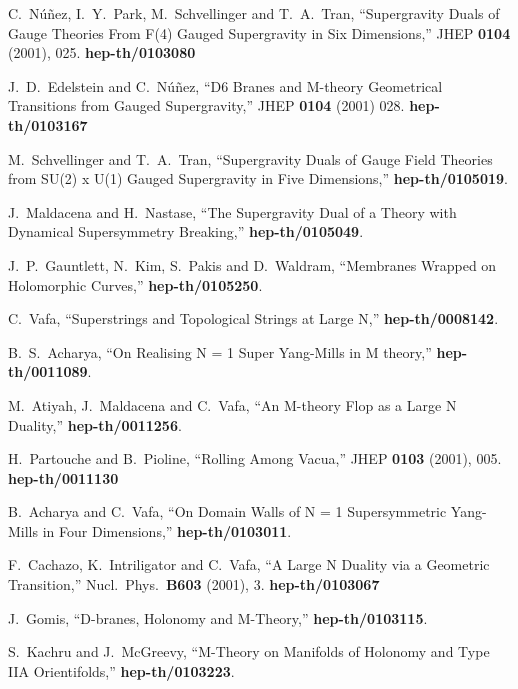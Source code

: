 \documentclass[12pt,a4paper]{article}
\begin{document}
\begin{thebibliography}{99}
 C.~N\'u\~nez, I.~Y.~Park, M.~Schvellinger and T.~A.~Tran,
``Supergravity Duals of Gauge Theories From F(4) Gauged Supergravity in Six Dimensions,''
JHEP {\bf 0104} (2001), 025. {\bf hep-th/0103080}

 J.~D.~Edelstein and C.~N\'u\~nez,
``D6 Branes and M-theory Geometrical Transitions from Gauged Supergravity,''
JHEP {\bf 0104} (2001) 028. {\bf hep-th/0103167}

 M.~Schvellinger and T.~A.~Tran,
``Supergravity Duals of Gauge Field Theories from SU(2) x U(1) Gauged Supergravity in Five Dimensions,''
{\bf hep-th/0105019}.

 J.~Maldacena and H.~Nastase,
``The Supergravity Dual of a Theory with Dynamical Supersymmetry Breaking,''
{\bf hep-th/0105049}.

 J.~P.~Gauntlett, N.~Kim, S.~Pakis and D.~Waldram,
``Membranes Wrapped on Holomorphic Curves,''
{\bf hep-th/0105250}.

 C.~Vafa, ``Superstrings and Topological Strings at Large N,''
{\bf hep-th/0008142}.

 B.~S.~Acharya, ``On Realising N = 1 Super Yang-Mills in M theory,''
{\bf hep-th/0011089}.

 M.~Atiyah, J.~Maldacena and C.~Vafa,
``An M-theory Flop as a Large N Duality,''
{\bf hep-th/0011256}.

 H.~Partouche and B.~Pioline,
``Rolling Among \coordHE{} Vacua,''
JHEP {\bf 0103} (2001), 005. {\bf hep-th/0011130}

 B.~Acharya and C.~Vafa,
``On Domain Walls of N = 1 Supersymmetric Yang-Mills in Four Dimensions,''
{\bf hep-th/0103011}.

 F.~Cachazo, K.~Intriligator and C.~Vafa,
``A Large N Duality via a Geometric Transition,''
Nucl.\ Phys.\  {\bf B603} (2001), 3. {\bf hep-th/0103067}

 J.~Gomis, ``D-branes, Holonomy and M-Theory,''
{\bf hep-th/0103115}.

 S.~Kachru and J.~McGreevy,
``M-Theory on Manifolds of \coordHE{} Holonomy and Type IIA Orientifolds,''
{\bf hep-th/0103223}.


\end{thebibliography}
\end{document}
